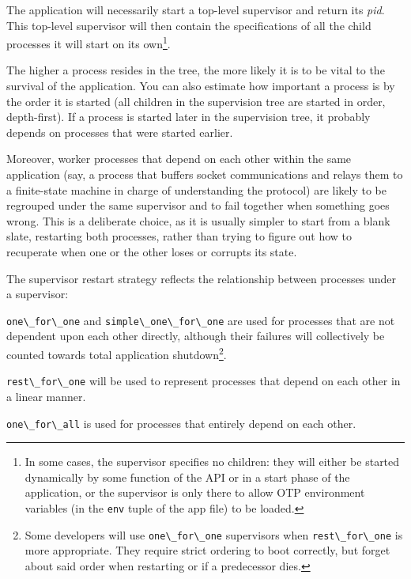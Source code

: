 \documentclass[11pt, oneside]{book}   	%
\newcommand{\expression}[1]{\Verb`#1`}
\begin{document}
The application will necessarily start a top-level supervisor and return its \emph{pid}. This top-level supervisor will then contain the specifications of all the child processes it will start on its own\footnote{In some cases, the supervisor specifies no children: they will either be started dynamically by some function of the API or in a start phase of the application, or the supervisor is only there to allow OTP environment variables (in the \expression{env} tuple of the app file) to be loaded.}.

The higher a process resides in the tree, the more likely it is to be vital to the survival of the application. You can also estimate how important a process is by the order it is started (all children in the supervision tree are started in order, depth-first). If a process is started later in the supervision tree, it probably depends on processes that were started earlier.

Moreover, worker processes that depend on each other within the same application (say, a process that buffers socket communications and relays them to a finite-state machine in charge of understanding the protocol) are likely to be regrouped under the same supervisor and to fail together when something goes wrong. This is a deliberate choice, as it is usually simpler to start from a blank slate, restarting both processes, rather than trying to figure out how to recuperate when one or the other loses or corrupts its state.

The supervisor restart strategy reflects the relationship between processes under a supervisor:

\begin{itemize*}
	\item \expression{one\_for\_one} and \expression{simple\_one\_for\_one} are used for processes that are not dependent upon each other directly, although their failures will collectively be counted towards total application shutdown\footnote{Some developers will use \expression{one\_for\_one} supervisors when \expression{rest\_for\_one} is more appropriate. They require strict ordering to boot correctly, but forget about said order when restarting or if a predecessor dies.}.
	\item \expression{rest\_for\_one} will be used to represent processes that depend on each other in a linear manner.
	\item \expression{one\_for\_all} is used for processes that entirely depend on each other.
\end{itemize*}
\end{document}

